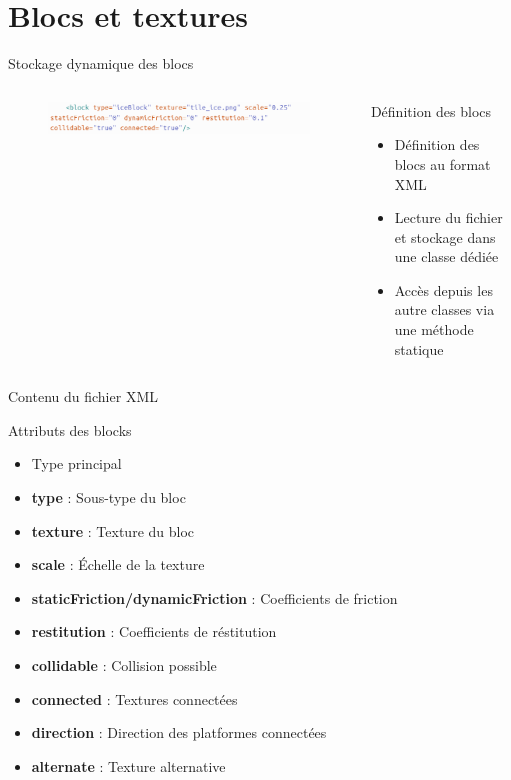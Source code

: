 \documentclass{beamer}
\begin{document}
{\section{Blocs et textures}
\begin{frame}{Stockage dynamique des blocs}
    \begin{columns}
            \begin{figure}
                \centering
                \includegraphics[width=1.0\textwidth]{XMLfile}
            \end{figure}
            \begin{block}{Définition des blocs}
                \begin{itemize}
                    \item[\bullet] Définition des blocs au format XML
                    \item[\bullet] Lecture du fichier et stockage dans une classe dédiée
                    \item[\bullet] Accès depuis les autre classes via une méthode statique
                \end{itemize}
            \end{block}
    \end{columns}
\end{frame}

\begin{frame}{Contenu  du fichier XML}
    \begin{block}{Attributs des blocks}
        \begin{itemize}
            \item[\bullet] Type principal
            \item[\bullet] \textbf{type} : Sous-type du bloc
            \item[\bullet] \textbf{texture} : Texture du bloc
            \item[\bullet] \textbf{scale} : Échelle de la texture
            \item[\bullet] \textbf{staticFriction/dynamicFriction} : Coefficients de friction
            \item[\bullet] \textbf{restitution} : Coefficients de réstitution
            \item[\bullet] \textbf{collidable} : Collision possible
            \item[\bullet] \textbf{connected} : Textures connectées
            \item[\bullet] \textbf{direction} : Direction des platformes connectées
            \item[\bullet] \textbf{alternate} : Texture alternative
        \end{itemize}
    \end{block}
\end{frame}

}
\end{document}
